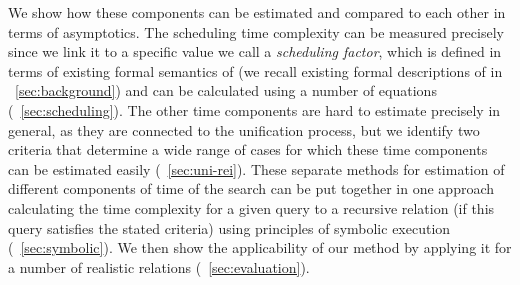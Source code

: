 We show how these components can be estimated and compared to each other in terms of asymptotics. The scheduling time complexity can be measured precisely since we link it to a specific value we call a
\emph{scheduling factor}, which is defined in terms of existing formal semantics of \mK (we recall existing formal descriptions of \mK in \sectionword~\ref{sec:background}) and can be calculated using
a number of equations (\sectionword~\ref{sec:scheduling}). The other time components are hard to estimate precisely in general, as they are connected to the unification process, but we identify two
criteria that determine a wide range of cases for which these time components can be estimated easily (\sectionword~\ref{sec:uni-rei}). These separate methods for estimation of
different components of time of the search can be put together in one approach calculating the time complexity for a given query to a recursive relation (if this query satisfies the stated criteria) using principles of symbolic execution (\sectionword~\ref{sec:symbolic}). We then show the applicability of our method by applying it for a number of realistic \mK relations (\sectionword~\ref{sec:evaluation}).
